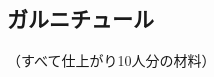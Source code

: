\hypertarget{garnitures-recettes}{%
\subsection{ガルニチュール}\label{garnitures-recettes}}


\begin{center}
（すべて仕上がり10人分の材料）
\end{center}
